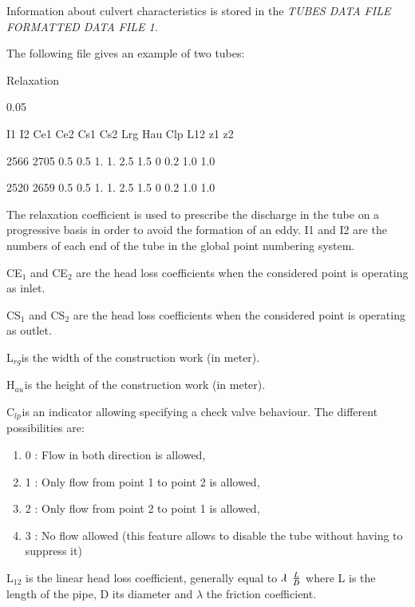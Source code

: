 \documentclass{article} %
\begin{document}
 Information about culvert characteristics is stored in the \textit{TUBES DATA FILE FORMATTED DATA FILE 1.}



 The following file gives an example of two tubes:

 Relaxation

     0.05

 I1   I2   Ce1  Ce2  Cs1  Cs2  Lrg  Hau  Clp  L12   z1  z2

 2566 2705 0.5  0.5  1.   1.   2.5  1.5  0    0.2   1.0 1.0

 2520 2659 0.5  0.5  1.   1.   2.5  1.5  0    0.2   1.0 1.0

 The relaxation coefficient is used to prescribe the discharge in the tube on a progressive basis in order to avoid the formation of an eddy. I1 and I2 are the numbers of each end of the tube in the global point numbering system.

 CE${}_{1}$ and CE${}_{2}$ are the head loss coefficients when the considered point is operating as inlet.

 CS${}_{1}$ and CS${}_{2}$ are the head loss coefficients when the considered point is operating as outlet.

 L${}_{rg }$is the width of the construction work (in meter).

 H${}_{au}$${}_{ }$is the height of the construction work (in meter).

 C${}_{lp}$${}_{ }$is an indicator allowing specifying a check valve behaviour. The different possibilities are:

\begin{enumerate}
\item  0 : Flow in both direction is allowed,

\item  1 : Only flow from point 1 to point 2 is allowed,

\item  2 : Only flow from point 2 to point 1 is allowed,

\item  3 : No flow allowed (this feature allows to disable the tube without having to suppress it)
\end{enumerate}

 L${}_{12}$ is the linear head loss coefficient, generally equal to $\lambda {\kern 1pt} {\kern 1pt} {\kern 1pt} {\kern 1pt} {\kern 1pt} \frac{L}{D} $ where L is the length of the pipe, D its diameter and $\lambda$ the friction coefficient.
\end{document}

